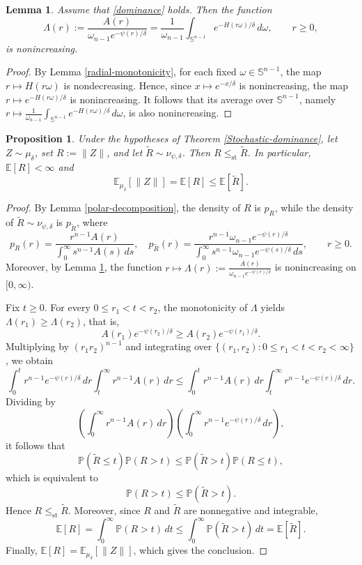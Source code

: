 \documentclass[11pt]{article}
\newcommand{\1}{\mathds{1}}
\newtheorem{proposition}[theorem]{Proposition}
\newtheorem{lemma}[theorem]{Lemma}
\theoremstyle{definition}
\theoremstyle{remark}
\theoremstyle{definition}
\begin{document}
\begin{lemma}\label{likelihood-ratio}
Assume that \eqref{dominance} holds. Then the function
\[
\Lambda(r):=\frac{A(r)}{\omega_{n-1}e^{-\psi(r)/\delta}}
=
\frac{1}{\omega_{n-1}}\int_{\mathbb{S}^{n-1}} e^{-H(r\omega)/\delta}\,d\omega,
\qquad r\ge 0,
\]
is nonincreasing.
\end{lemma}
\begin{proof}
By Lemma \ref{radial-monotonicity}, for each fixed \(\omega\in\mathbb{S}^{n-1}\), the map \(r\mapsto H(r\omega)\) is nondecreasing. Hence, since \(x\mapsto e^{-x/\delta}\) is nonincreasing, the map \(r\mapsto e^{-H(r\omega)/\delta}\) is nonincreasing. It follows that its average over \(\mathbb{S}^{n-1}\), namely \(r\mapsto \frac{1}{\omega_{n-1}}\int_{\mathbb{S}^{n-1}} e^{-H(r\omega)/\delta}\,d\omega\), is also nonincreasing.
\end{proof}
\begin{proposition}\label{stochastic-dominance-lemma}
Under the hypotheses of Theorem \ref{Stochastic-dominance}, let
\(Z\sim\mu_\delta\), set \(R:=\|Z\|\), and let \(\widetilde R\sim\nu_{\psi,\delta}\).
Then \(R\le_{\textrm{st}}\widetilde R\). In particular, \(\mathbb{E}[R]<\infty\) and
\[
\mathbb{E}_{\mu_\delta}[\|Z\|]
=
\mathbb{E}[R]
\le
\mathbb{E}[\widetilde R].
\]
\end{proposition}
\begin{proof}
By Lemma \ref{polar-decomposition}, the density of \(R\) is \(p_R\), while the density of \(\widetilde R\sim\nu_{\psi,\delta}\) is \(p_{\widetilde R}\), where
\[
p_R(r)=\frac{r^{n-1}A(r)}{\displaystyle\int_0^\infty s^{n-1}A(s)\,ds},
\quad
p_{\widetilde R}(r)=
\frac{r^{n-1}\omega_{n-1}e^{-\psi(r)/\delta}}
{\displaystyle\int_0^\infty s^{n-1}\omega_{n-1}e^{-\psi(s)/\delta}\,ds},
\qquad r\ge 0.
\]
Moreover, by Lemma \ref{likelihood-ratio}, the function $r\mapsto \Lambda(r):=\frac{A(r)}{\omega_{n-1}e^{-\psi(r)/\delta}}$ is nonincreasing on \([0,\infty)\).

Fix \(t\ge 0\). For every \(0\le r_1<t<r_2\), the monotonicity of \(\Lambda\) yields $\Lambda(r_1)\ge \Lambda(r_2)$,  that is,
\[
A(r_1)e^{-\psi(r_2)/\delta}\ge A(r_2)e^{-\psi(r_1)/\delta}.
\]
Multiplying by \((r_1r_2)^{n-1}\) and integrating over
\(\{(r_1,r_2):0\le r_1<t<r_2<\infty\}\), we obtain
\[
\int_0^t r^{n-1}e^{-\psi(r)/\delta}\,dr
\int_t^\infty r^{n-1}A(r)\,dr
\le
\int_0^t r^{n-1}A(r)\,dr
\int_t^\infty r^{n-1}e^{-\psi(r)/\delta}\,dr.
\]
Dividing by
\[
\left(\int_0^\infty r^{n-1}A(r)\,dr\right)
\left(\int_0^\infty r^{n-1}e^{-\psi(r)/\delta}\,dr\right),
\]
it follows that
\[
\mathbb{P}(\tilde{R} \leq t) \mathbb{P}(R>t)\le \mathbb{P}(\widetilde R>t) \mathbb{P}(R\leq t),
\]
which is equivalent to
\[
\mathbb{P}(R>t)\le \mathbb{P}(\widetilde R>t).
\]
Hence \(R\le_{\textrm{st}}\widetilde R\).  Moreover, since \(R\) and \(\widetilde R\) are nonnegative and integrable,
\[
\mathbb{E}[R]
=
\int_0^\infty \mathbb{P}(R>t)\,dt
\le
\int_0^\infty \mathbb{P}(\widetilde R>t)\,dt
=
\mathbb{E}[\widetilde R].
\]
Finally, \(\mathbb{E}[R]=\mathbb{E}_{\mu_\delta}[\|Z\|]\), which gives the conclusion.
\end{proof}
\end{document}
